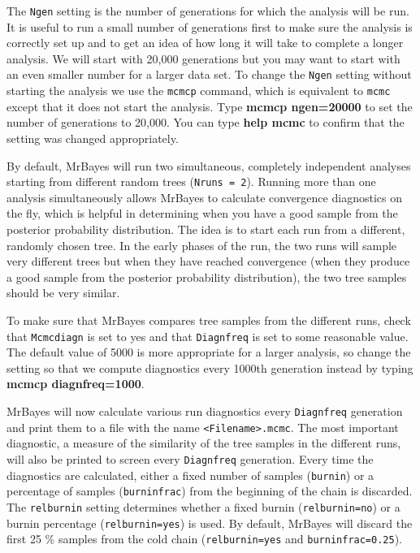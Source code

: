 \documentclass[12pt]{book}
\begin{document}
The \texttt{Ngen} setting is the number of generations for which the analysis will be run. It is useful to
 run a small number of generations first to make sure the analysis is correctly set up and to get an idea
 of how long it will take to complete a longer analysis. We will start with 20,000 generations but you may
 want to start with an even smaller number for a larger data set. To change the \texttt{Ngen} setting without
 starting the analysis we use the \texttt{mcmcp} command, which is equivalent to \texttt{mcmc} except that it
 does not start the analysis. Type \textbf{mcmcp ngen=20000} to set the number of generations to 20,000. You
 can type \textbf{help mcmc} to confirm that the setting was changed appropriately.

By default, MrBayes will run two simultaneous, completely independent analyses starting from different random
 trees (\texttt{Nruns = 2}). Running more than one analysis simultaneously allows MrBayes to calculate
 convergence diagnostics on the fly, which is helpful in determining when you have a good sample from the
 posterior probability distribution. The idea is to start each run from a different, randomly chosen tree.
 In the early phases of the run, the two runs will sample very different trees but when they have reached
 convergence (when they produce a good sample from the posterior probability distribution), the two tree
 samples should be very similar.

To make sure that MrBayes compares tree samples from the different runs, check that \texttt{Mcmcdiagn} is set
 to yes and that \texttt{Diagnfreq} is set to some reasonable value. The default value of 5000 is more
 appropriate for a larger analysis, so change the setting so that we compute diagnostics every 1000th
 generation instead by typing \textbf{mcmcp diagnfreq=1000}.

MrBayes will now calculate various run diagnostics every \texttt{Diagnfreq} generation and print them to a
 file with the name \texttt{<Filename>.mcmc}. The most important diagnostic, a measure of the similarity of
 the tree samples in the different runs, will also be printed to screen every \texttt{Diagnfreq} generation.
 Every time the diagnostics are calculated, either a fixed number of samples (\texttt{burnin}) or a
 percentage of samples (\texttt{burninfrac}) from the beginning of the chain is discarded.
 The \texttt{relburnin} setting determines whether a fixed burnin (\texttt{relburnin=no}) or a burnin
 percentage (\texttt{relburnin=yes}) is used. By default, MrBayes will discard the first 25 \% samples from
 the cold chain (\texttt{relburnin=yes} and \texttt{burninfrac=0.25}).
\end{document}
